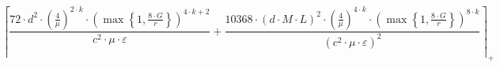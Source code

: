 \[\left\lceil \frac{72 \cdot d^{2} \cdot \left(\frac{4}{\mu}\right)^{2 \cdot k} \cdot \left(\max\left\{ 1, \frac{8 \cdot G}{r} \right\}\right)^{4 \cdot k + 2}}{c^{2} \cdot \mu \cdot \varepsilon} + \frac{10368 \cdot \left(d \cdot M \cdot L\right)^{2} \cdot \left(\frac{4}{\mu}\right)^{4 \cdot k} \cdot \left(\max\left\{ 1, \frac{8 \cdot G}{r} \right\}\right)^{8 \cdot k}}{\left(c^{2} \cdot \mu \cdot \varepsilon\right)^{2}} \right\rceil_{+}\]
